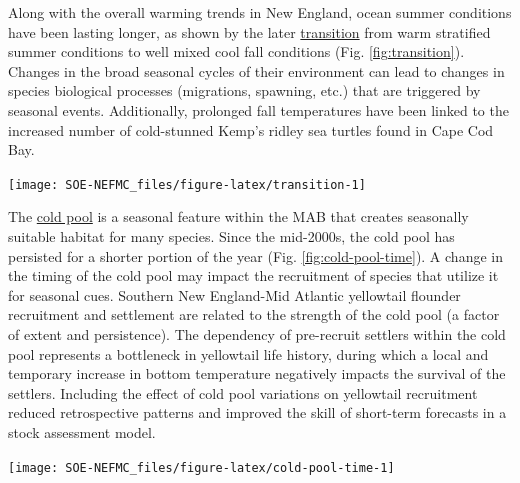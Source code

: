 \documentclass[
  10pt,
]{article}
\let\origfigure\figure
\let\endorigfigure\endfigure
\renewenvironment{figure}[1][2] {
    \expandafter\origfigure\expandafter[H]
} {
    \endorigfigure
}
\begin{document}
Along with the overall warming trends in New England, ocean summer conditions have been lasting longer, as shown by the later \href{https://noaa-edab.github.io/catalog/transition-dates.html}{transition} from warm stratified summer conditions to well mixed cool fall conditions (Fig. \ref{fig:transition}). Changes in the broad seasonal cycles of their environment can lead to changes in species biological processes (migrations, spawning, etc.) that are triggered by seasonal events. Additionally, prolonged fall temperatures have been linked to the increased number of cold-stunned Kemp's ridley sea turtles found in Cape Cod Bay.

\begin{figure}

{\centering \texttt{[image: SOE-NEFMC\_files/figure-latex/transition-1]} 

}

\caption{Ocean summer length: the annual total number of days between the spring thermal transition date and the fall thermal transition date. The transition dates are defined as the day of the year when surface temperatures change from cool to warm conditions in the spring and back to cool conditions in the fall.}\label{fig:transition}
\end{figure}

The \href{https://noaa-edab.github.io/catalog/cold-pool-index.html}{cold pool} is a seasonal feature within the MAB that creates seasonally suitable habitat for many species. Since the mid-2000s, the cold pool has persisted for a shorter portion of the year (Fig. \ref{fig:cold-pool-time}). A change in the timing of the cold pool may impact the recruitment of species that utilize it for seasonal cues. Southern New England-Mid Atlantic yellowtail flounder recruitment and settlement are related to the strength of the cold pool (a factor of extent and persistence). The dependency of pre-recruit settlers within the cold pool represents a bottleneck in yellowtail life history, during which a local and temporary increase in bottom temperature negatively impacts the survival of the settlers. Including the effect of cold pool variations on yellowtail recruitment reduced retrospective patterns and improved the skill of short-term forecasts in a stock assessment model.

\begin{figure}

{\centering \texttt{[image: SOE-NEFMC\_files/figure-latex/cold-pool-time-1]} 

}

\caption{Seasonal cold pool annual duration. Open circles represent data derived from ROMS -NWA and closed circle data are derived from GLORYS.}\label{fig:cold-pool-time}
\end{figure}
\end{document}
